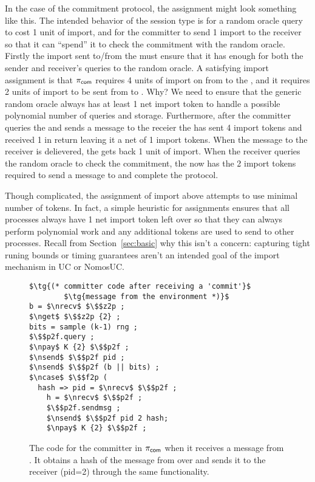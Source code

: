 In the case of the commitment protocol, the assignment might look something like this.
The intended behavior of the session type is for a random oracle query to cost 1 unit of import, and for the committer to send 1 import to the receiver so that it can ``spend'' it to check the commitment with the random oracle. 
Firstly the import sent to/from the \partywrapper must ensure that it has enough for both the sender and receiver's queries to the random oracle. 
A satisfying import assignment is that $\pi_{{\mathsf {com}}}$ requires 4 units of import on  from \Z to the \partywrapper, and it requires 2 units of import to be sent from \partywrapper to \Fropp. Why?
We need to ensure that the generic random oracle always has at least 1 net import token to handle a possible polynomial number of queries and storage. 
Furthermore, after the committer queries the \Fro and sends a message to the receier the \partywrapper has sent 4 import tokens and received 1 in return leaving it a net of 1 import tokens. 
When the message to the receiver is delievered, the \partywrapper gets back 1 unit of import. When the receiver queries the random oracle to check the commitment, the \partywrapper now has the 2 import tokens required to send a message to \Fropp and complete the protocol. 

Though complicated, the assignment of import above attempts to use minimal number of tokens. In fact, a simple heuristic for assignments ensures that all processes always have 1 net import token left over so that they can always perform polynomial work and any additional tokens are used to send to other processes. 
Recall from Section~\ref{sec:basic} why this isn't a concern: capturing tight runing bounds or timing guarantees aren't an intended goal of the import mechanism in UC or NomosUC.

\begin{figure}
\begin{lstlisting}[basicstyle=\footnotesize\BeraMonottFamily, frame=single, mathescape]
$\tg{(* committer code after receiving a 'commit'}$
        $\tg{message from the environment *)}$
b = $\nrecv$ $\$$z2p ;
$\nget$ $\$$z2p {2} ;
bits = sample (k-1) rng ;
$\$$p2f.query ;
$\npay$ K {2} $\$$p2f ;
$\nsend$ $\$$p2f pid ;
$\nsend$ $\$$p2f (b || bits) ;
$\ncase$ $\$$f2p (
  hash => pid = $\nrecv$ $\$$p2f ; 
    h = $\nrecv$ $\$$p2f ;
    $\$$p2f.sendmsg ;
    $\nsend$ $\$$p2f pid 2 hash;
	$\npay$ K {2} $\$$p2f ;
\end{lstlisting}
\caption{The code for the committer in $\pi_{{\mathsf {com}}}$ when it receives a  message from \Z. It obtains a hash of the message from \Fropp over  and sends it to the receiver (pid=2) through the same functionality.}
\label{lst:committer}
\vspace{-2mm}
\end{figure}

